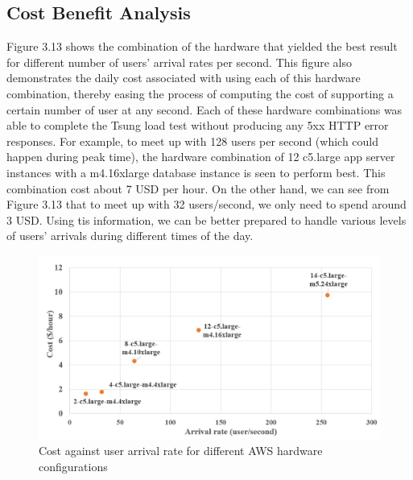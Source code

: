\subsection {Cost Benefit Analysis}

Figure 3.13 shows the combination of the hardware that yielded the best result for different number of users' arrival rates per second. This figure also demonstrates the daily cost associated with using each of this hardware combination, thereby easing the process of computing the cost of supporting a certain number of user at any second. Each of these hardware combinations was able to complete the Tsung load test without producing any 5xx HTTP error responses. For example, to meet up with 128 users per second (which could happen during peak time), the hardware combination of 12 c5.large app server instances with a m4.16xlarge database instance is seen to perform best. This combination cost about 7 USD per hour. On the other hand, we can see from Figure 3.13 that to meet up with 32 users/second, we only need to spend around 3 USD. Using tis information, we can be better prepared to handle various levels of users' arrivals during different times of the day.
\begin{figure}[h]
	\centering
	\includegraphics[width=1\textwidth]{images/cost.PNG}
	\caption{Cost against user arrival rate for different AWS hardware configurations}\label{fig:sqlopt}
\end{figure}


